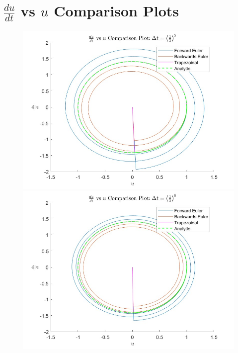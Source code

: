 \documentclass[12pt,letterpaper]{article}
\begin{document}
\section*{$\frac{du}{dt}$ vs $u$ Comparison Plots}
\begin{figure}[!h]
    \centering
    \includegraphics[width = 0.85\linewidth]{dudt_vs_u1.jpg}
    \includegraphics[width = 0.85\linewidth]{dudt_vs_u2.jpg}
\end{figure}
\newpage
\end{document}
